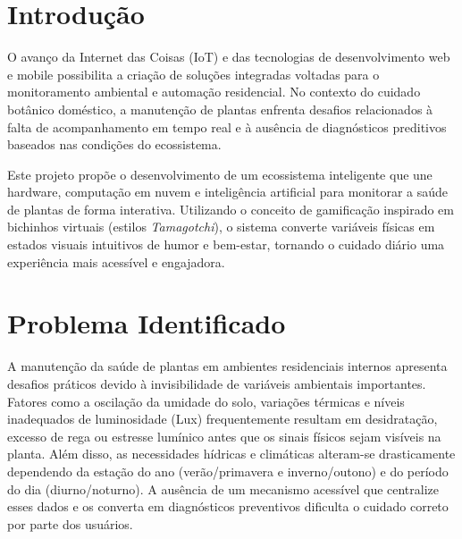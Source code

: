 \documentclass[
	12pt,
	article,
	oneside,
	a4paper,
	english,
	brazil
	]{abntex2}
\begin{document}

\tableofcontents

\cleardoublepage


\textual

\section*{Introdução}
O avanço da Internet das Coisas (IoT) e das tecnologias de desenvolvimento web e mobile possibilita a criação de soluções integradas voltadas para o monitoramento ambiental e automação residencial. No contexto do cuidado botânico doméstico, a manutenção de plantas enfrenta desafios relacionados à falta de acompanhamento em tempo real e à ausência de diagnósticos preditivos baseados nas condições do ecossistema. 

Este projeto propõe o desenvolvimento de um ecossistema inteligente que une hardware, computação em nuvem e inteligência artificial para monitorar a saúde de plantas de forma interativa. Utilizando o conceito de gamificação inspirado em bichinhos virtuais (estilos \textit{Tamagotchi}), o sistema converte variáveis físicas em estados visuais intuitivos de humor e bem-estar, tornando o cuidado diário uma experiência mais acessível e engajadora.


\section{Problema Identificado}
A manutenção da saúde de plantas em ambientes residenciais internos apresenta desafios práticos devido à invisibilidade de variáveis ambientais importantes. Fatores como a oscilação da umidade do solo, variações térmicas e níveis inadequados de luminosidade (Lux) frequentemente resultam em desidratação, excesso de rega ou estresse lumínico antes que os sinais físicos sejam visíveis na planta. Além disso, as necessidades hídricas e climáticas alteram-se drasticamente dependendo da estação do ano (verão/primavera e inverno/outono) e do período do dia (diurno/noturno). A ausência de um mecanismo acessível que centralize esses dados e os converta em diagnósticos preventivos dificulta o cuidado correto por parte dos usuários.
\end{document}
